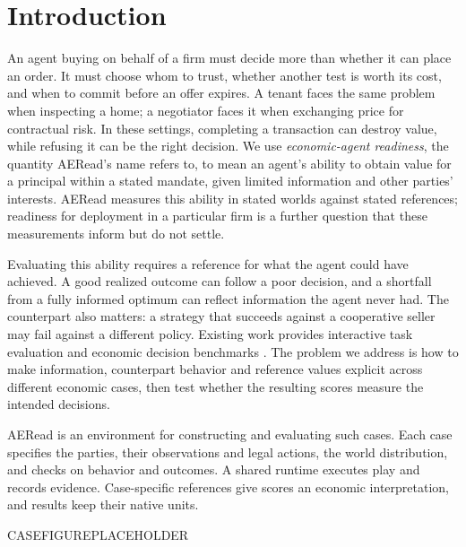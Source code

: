 \section{Introduction}
\label{sec:introduction}

An agent buying on behalf of a firm must decide more than whether it can
place an order. It must choose whom to trust, whether another test is worth
its cost, and when to commit before an offer expires. A tenant faces the
same problem when inspecting a home; a negotiator faces it when exchanging
price for contractual risk. In these settings, completing a transaction
can destroy value, while refusing it can be the right decision. We use
\emph{economic-agent readiness}, the quantity AERead's name refers to, to
mean an agent's ability to obtain value for a principal within a stated
mandate, given limited information and other parties' interests. AERead
measures this ability in stated worlds against stated references;
readiness for deployment in a particular firm is a further question that
these measurements inform but do not settle.

Evaluating this ability requires a reference for what the agent could
have achieved. A good realized outcome can follow a poor decision, and a
shortfall from a fully informed optimum can reflect information the agent
never had. The counterpart also matters: a strategy that succeeds against
a cooperative seller may fail against a different policy. Existing work
provides interactive task evaluation and economic decision benchmarks
\citep{merrill2026terminalbench,fish2025econevals,zhang2026termsbench}.
The problem we address is how to make information, counterpart behavior
and reference values explicit across different economic cases, then test
whether the resulting scores measure the intended decisions.

AERead is an environment for constructing and evaluating such cases.
Each case specifies the parties, their observations and legal actions,
the world distribution, and checks on behavior and outcomes. A shared
runtime executes play and records evidence. Case-specific references give
scores an economic interpretation, and results keep their native units.

CASEFIGUREPLACEHOLDER

